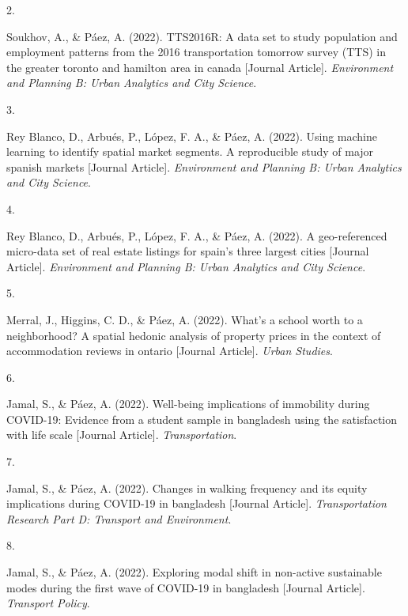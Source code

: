\documentclass[10pt,a4paper,]{twentysecondcv}
\newlength{\csllabelwidth}
\newcommand{\CSLLeftMargin}[1]{\parbox[t]{\csllabelwidth}{#1}}
\newcommand{\CSLRightInline}[1]{\parbox[t]{\linewidth - \csllabelwidth}{#1}}
\begin{document}
\leavevmode{}%
\CSLLeftMargin{2. }%
\CSLRightInline{Soukhov, A., \& Páez, A. (2022). TTS2016R: A data set to
study population and employment patterns from the 2016 transportation
tomorrow survey (TTS) in the greater toronto and hamilton area in canada
{[}Journal Article{]}. \emph{Environment and Planning B: Urban Analytics
and City Science}.}

\leavevmode{}%
\CSLLeftMargin{3. }%
\CSLRightInline{Rey Blanco, D., Arbués, P., López, F. A., \& Páez, A.
(2022). Using machine learning to identify spatial market segments. A
reproducible study of major spanish markets {[}Journal Article{]}.
\emph{Environment and Planning B: Urban Analytics and City Science}.}

\leavevmode{}%
\CSLLeftMargin{4. }%
\CSLRightInline{Rey Blanco, D., Arbués, P., López, F. A., \& Páez, A.
(2022). A geo-referenced micro-data set of real estate listings for
spain's three largest cities {[}Journal Article{]}. \emph{Environment
and Planning B: Urban Analytics and City Science}.}

\leavevmode{}%
\CSLLeftMargin{5. }%
\CSLRightInline{Merral, J., Higgins, C. D., \& Páez, A. (2022). What's a
school worth to a neighborhood? A spatial hedonic analysis of property
prices in the context of accommodation reviews in ontario {[}Journal
Article{]}. \emph{Urban Studies}.}

\leavevmode{}%
\CSLLeftMargin{6. }%
\CSLRightInline{Jamal, S., \& Páez, A. (2022). Well-being implications
of immobility during COVID-19: Evidence from a student sample in
bangladesh using the satisfaction with life scale {[}Journal Article{]}.
\emph{Transportation}.}

\leavevmode{}%
\CSLLeftMargin{7. }%
\CSLRightInline{Jamal, S., \& Páez, A. (2022). Changes in walking
frequency and its equity implications during COVID-19 in bangladesh
{[}Journal Article{]}. \emph{Transportation Research Part D: Transport
and Environment}.}

\leavevmode{}%
\CSLLeftMargin{8. }%
\CSLRightInline{Jamal, S., \& Páez, A. (2022). Exploring modal shift in
non-active sustainable modes during the first wave of COVID-19 in
bangladesh {[}Journal Article{]}. \emph{Transport Policy}.}
\end{document}
